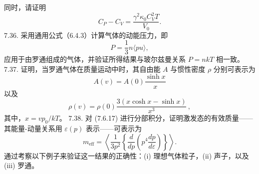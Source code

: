 同时，请证明
\begin{equation}\tag{7.5.69}\label{eq:7.5.69}
C _ { P } - C _ { V } = \frac { \gamma ^{2} \kappa _ { 0 } C _ { V } ^{2} T } { V _ { 0 } } .
\end{equation}
7.36. 采用通用公式（6.4.3）计算气体的动能压力，即
\begin{equation}\tag{7.5.70}\label{eq:7.5.70}
P = \frac { 1 } { 3 } n \langle p u \rangle ,
\end{equation}
应用于由罗通组成的气体，并验证所得结果与玻尔兹曼关系 \(P = n k T\) 相一致。
7.37. 证明，当罗通气体在质量运动中时，其自由能 \(A\) 与惯性密度 \(\rho\) 分别可表示为
\begin{equation}\tag{7.5.71}\label{eq:7.5.71}
A ( v ) = A ( 0 ) { \frac { \sinh x } { x } }
\end{equation}
以及
\begin{equation}\tag{7.5.72}\label{eq:7.5.72}
\rho ( v ) = \rho ( 0 ) \frac { 3 ( x \cosh x - \sinh x ) } { x ^{3} } \, ,
\end{equation}
其中，\(x = v p_0 / k T\)。
7.38. 对 (7.6.17) 进行分部积分，证明激发态的有效质量——其能量-动量关系用 \(\varepsilon(p)\) 表示——可表示为
\begin{equation}\tag{7.5.73}\label{eq:7.5.73}
m _ { \mathrm { e f f } } = \left\langle \frac { 1 } { 3 p ^{2} } \left\{ \frac { d } { d p } \left( p ^{4} \frac { d p } { d \varepsilon } \right) \right\} \right\rangle .
\end{equation}
通过考察以下例子来验证这一结果的正确性：(i) 理想气体粒子，(ii) 声子，以及 (iii) 罗通。

